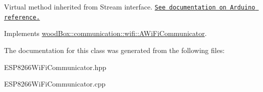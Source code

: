 Virtual method inherited from Stream interface. \href{https://www.arduino.cc/en/Serial/Write}{\tt See documentation on Arduino reference.} 

Implements \mbox{\hyperlink{classwood_box_1_1communication_1_1wifi_1_1_a_wi_fi_communicator_a7c40345fe59737b83bfee33ecb7be013}{wood\+Box\+::communication\+::wifi\+::\+A\+Wi\+Fi\+Communicator}}.



The documentation for this class was generated from the following files\+:\begin{DoxyCompactItemize}
\item 
E\+S\+P8266\+Wi\+Fi\+Communicator.\+hpp\item 
E\+S\+P8266\+Wi\+Fi\+Communicator.\+cpp\end{DoxyCompactItemize}
